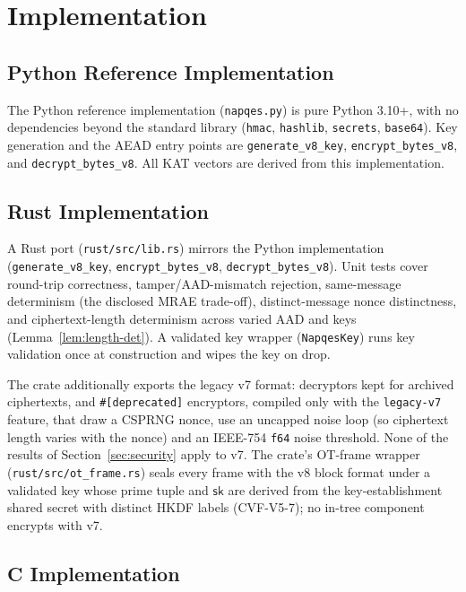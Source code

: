 \documentclass[11pt,a4paper]{article}
\begin{document}
\section{Implementation}
\label{sec:implementation}

\subsection{Python Reference Implementation}

The Python reference implementation (\texttt{napqes.py}) is pure Python
3.10+, with no dependencies beyond the standard library (\texttt{hmac},
\texttt{hashlib}, \texttt{secrets}, \texttt{base64}). Key generation and
the AEAD entry points are \texttt{generate\_v8\_key},
\texttt{encrypt\_bytes\_v8}, and \texttt{decrypt\_bytes\_v8}. All KAT
vectors are derived from this implementation.

\subsection{Rust Implementation}

A Rust port (\texttt{rust/src/lib.rs}) mirrors the Python implementation
(\texttt{generate\_v8\_key}, \texttt{encrypt\_bytes\_v8},
\texttt{decrypt\_bytes\_v8}). Unit tests cover round-trip correctness,
tamper/AAD-mismatch rejection, same-message determinism (the disclosed
MRAE trade-off), distinct-message nonce distinctness, and
ciphertext-length determinism across varied AAD and keys
(Lemma~\ref{lem:length-det}). A validated key wrapper
(\texttt{NapqesKey}) runs key validation once at construction and wipes
the key on drop.

The crate additionally exports the legacy v7 format: decryptors kept for
archived ciphertexts, and \texttt{\#[deprecated]} encryptors, compiled only
with the \texttt{legacy-v7} feature, that draw a
CSPRNG nonce, use an uncapped noise loop (so ciphertext length varies with
the nonce) and an IEEE-754 \texttt{f64} noise threshold. None of the
results of Section~\ref{sec:security} apply to v7. The crate's OT-frame
wrapper (\texttt{rust/src/ot\_frame.rs}) seals every frame with the v8 block
format under a validated key whose prime tuple and $\mathsf{sk}$ are
derived from the key-establishment shared secret with distinct HKDF labels
(CVF-V5-7); no in-tree component encrypts with v7.

\subsection{C Implementation}
\end{document}
